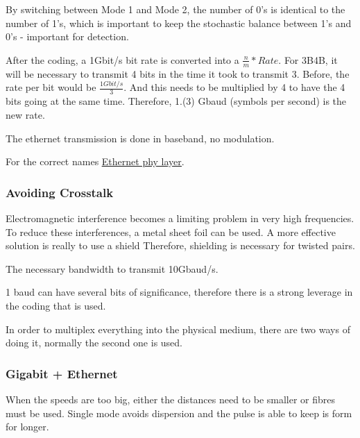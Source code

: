 By switching between Mode 1 and Mode 2, the number of 0's is identical to the number of 1's, which is important to keep the stochastic balance between 1's and 0's - important for detection.



After the coding, a 1Gbit/s bit rate is converted into a $\frac{n}{m} * Rate$. For 3B4B, it will be necessary to transmit 4 bits in the time it took to transmit 3. Before, the rate per bit would be $\frac{1Gbit/s}{3}$. And this needs to be multiplied by 4 to have the 4 bits going at the same time. Therefore, 1.(3) Gbaud (symbols per second) is the new rate.



The ethernet transmission is done in baseband, no modulation.


For the correct names \href{https://en.wikipedia.org/wiki/Ethernet_physical_layer}{\ul{Ethernet phy layer}}.


\subsubsection*{Avoiding Crosstalk}
Electromagnetic interference becomes a limiting problem in very high frequencies.
To reduce these interferences, a metal sheet foil can be used. A more effective solution is really to use a shield 
Therefore, shielding is necessary for twisted pairs.


The necessary bandwidth to transmit 10Gbaud/s.

1 baud can have several bits of significance, therefore there is a strong leverage in the coding that is used.




In order to multiplex everything into the physical medium, there are two ways of doing it, normally the second one is used.




\subsubsection*{Gigabit + Ethernet}
When the speeds are too big, either the distances need to be smaller or fibres must be used. Single mode avoids dispersion and the pulse is able to keep is form for longer.



